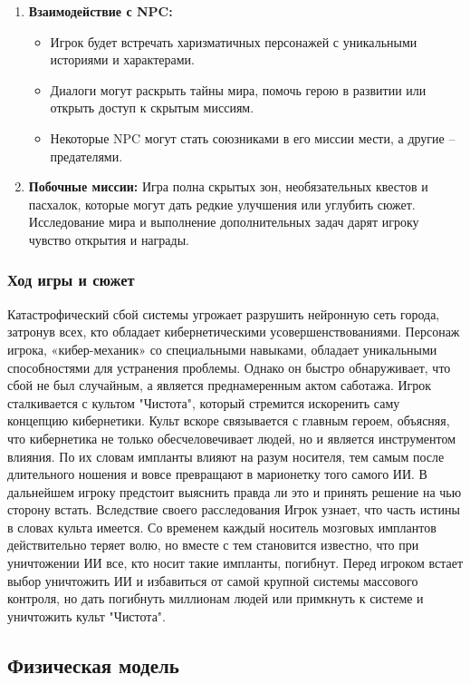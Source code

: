 \documentclass{article}
\begin{document}
\begin{enumerate}
    \item \textbf{Взаимодействие с NPC:}  
    \begin{itemize}
        \item Игрок будет встречать харизматичных персонажей с уникальными историями и характерами.
        \item Диалоги могут раскрыть тайны мира, помочь герою в развитии или открыть доступ к скрытым миссиям.
        \item Некоторые NPC могут стать союзниками в его миссии мести, а другие – предателями.
    \end{itemize}
    \item \textbf{Побочные миссии:}  
    Игра полна скрытых зон, необязательных квестов и пасхалок, которые могут дать редкие улучшения или углубить сюжет.  
    Исследование мира и выполнение дополнительных задач дарят игроку чувство открытия и награды.
\end{enumerate}

\subsubsection{Ход игры и сюжет}
Катастрофический сбой системы угрожает разрушить нейронную сеть города, затронув всех, 
кто обладает кибернетическими усовершенствованиями. Персонаж игрока, «кибер-механик» со специальными навыками, 
обладает уникальными способностями для устранения проблемы. Однако он быстро обнаруживает, 
что сбой не был случайным, а является преднамеренным актом саботажа. 
Игрок сталкивается с культом "Чистота",
который стремится искоренить саму концепцию кибернетики. Культ вскоре связывается с главным героем, объясняя,
что кибернетика не только обесчеловечивает людей, но и является инструментом влияния. По их словам импланты 
влияют на разум носителя, тем самым после длительного ношения и вовсе превращают в марионетку того самого ИИ.
В дальнейшем игроку предстоит выяснить правда ли это и принять решение на чью сторону встать. Вследствие своего расследования
Игрок узнает, что часть истины в словах культа имеется. Со временем каждый носитель мозговых имплантов действительно теряет волю,
но вместе с тем становится известно, что при уничтожении ИИ все, кто носит такие импланты, погибнут.
Перед игроком встает выбор уничтожить ИИ и избавиться от самой крупной системы массового контроля, но дать погибнуть миллионам людей
или примкнуть к системе и уничтожить культ "Чистота".


\subsection{Физическая модель}
\end{document}
